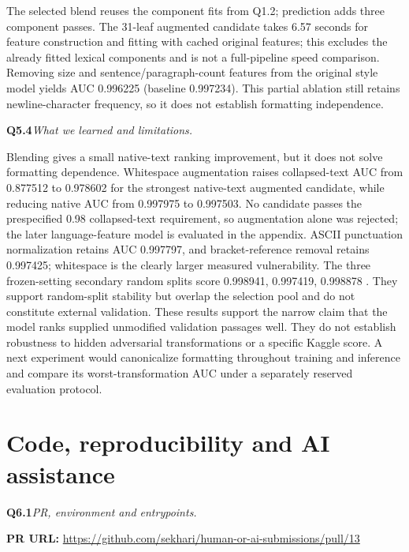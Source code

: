 \documentclass[10pt,letterpaper]{article}
\newcommand{\q}[2]{\needspace{4\baselineskip}\par\addvspace{7pt}\textbf{#1}\quad\textit{#2}\par\nobreak}
\begin{document}
The selected blend reuses the component fits from Q1.2; prediction adds three component passes.
The 31-leaf augmented candidate takes
6.57
 seconds for feature construction and fitting with cached original features; this excludes the already fitted lexical components and is not a full-pipeline speed comparison.
Removing size and sentence/paragraph-count features from the original style model yields AUC
0.996225
 (baseline 0.997234). This partial ablation still retains newline-character frequency, so it does not establish formatting independence.
\q{Q5.4}{What we learned and limitations.}
Blending gives a small native-text ranking improvement, but it does not solve formatting dependence.
Whitespace augmentation raises collapsed-text AUC from 0.877512 to 0.978602 for the strongest native-text augmented candidate, while reducing native AUC from 0.997975 to 0.997503.
No candidate passes the prespecified 0.98 collapsed-text requirement, so augmentation alone was rejected; the later language-feature model is evaluated in the appendix.
ASCII punctuation normalization retains AUC 0.997797, and bracket-reference removal retains 0.997425; whitespace is the clearly larger measured vulnerability.
The three frozen-setting secondary random splits score
0.998941, 0.997419, 0.998878
. They support random-split stability but overlap the selection pool and do not constitute external validation.
These results support the narrow claim that the model ranks supplied unmodified validation passages well.
They do not establish robustness to hidden adversarial transformations or a specific Kaggle score.
A next experiment would canonicalize formatting throughout training and inference and compare its worst-transformation AUC under a separately reserved evaluation protocol.
\newpage
\section{Code, reproducibility and AI assistance}
\q{Q6.1}{PR, environment and entrypoints.}
\textbf{PR URL:}
\url{https://github.com/sekhari/human-or-ai-submissions/pull/13}
\end{document}
